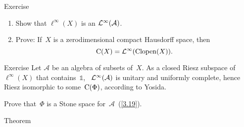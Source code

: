 \documentclass[main.tex]{subfiles}
\begin{document}
%
%
\begin{psec}{6.8}{Exercise}
\begin{enumerate}
\item\label{6.8-1}
Show that $\ell^\infty(X)$ is an $\mathcal{L}^\infty(\mathcal A)$.
%
\item\label{6.8-2}
Prove:
If~$X$ is a zerodimensional compact Hausdorff space,
then
\begin{equation*}
\mathrm{C}(X)=\mathcal{L}^\infty(\mathrm{Clopen}(X))\text{.}
\end{equation*}
\end{enumerate}
\end{psec}
%
%
\begin{psec}{6.9}{Exercise}
Let $\mathcal A$ be an algebra of subsets of~$X$.
As a closed Riesz subspace of~$\ell^\infty(X)$
that contains~$\mathbb 1$, \ 
$\mathcal{L}^\infty(\mathcal A)$ is unitary and uniformly complete,
hence Riesz isomorphic to some~$\mathrm{C}(\Phi)$,
according to Yosida.

Prove that~$\Phi$ is a Stone space for~$\mathcal A$~(\ref{3.19}).
\end{psec}
\clearpage
%
%
\begin{psec}{6.10}{Theorem}\end{psec}
\end{document}
